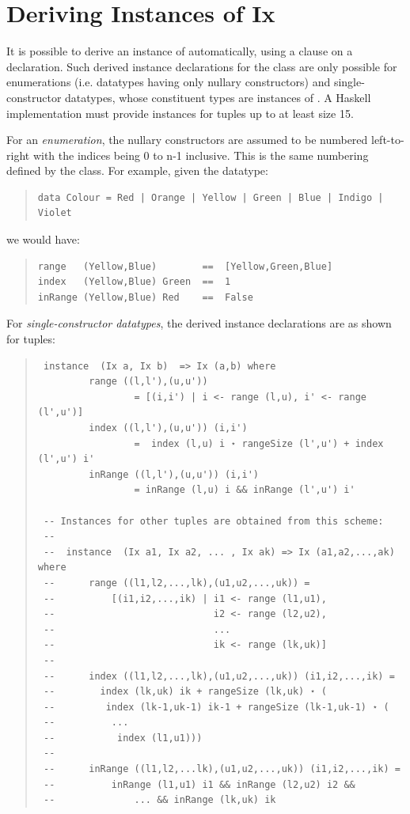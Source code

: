 \section{Deriving Instances of Ix}
It is possible to derive an instance of  automatically, using a
  clause on a  declaration. Such derived instance
 declarations for the class  are only possible for enumerations (i.e.
 datatypes having only nullary constructors) and single-constructor
 datatypes, whose constituent types are instances of . A Haskell
 implementation must provide  instances for tuples up to at least size
 15.\par
For an \emph{enumeration}, the nullary constructors are assumed to be numbered
 left-to-right with the indices being 0 to n-1 inclusive. This is the same
 numbering defined by the  class. For example, given the datatype:\par
\begin{quote}
{\haddockverb\begin{verbatim}
data Colour = Red | Orange | Yellow | Green | Blue | Indigo | Violet
\end{verbatim}}
\end{quote}
we would have:\par
\begin{quote}
{\haddockverb\begin{verbatim}
range   (Yellow,Blue)        ==  [Yellow,Green,Blue]
index   (Yellow,Blue) Green  ==  1
inRange (Yellow,Blue) Red    ==  False
\end{verbatim}}
\end{quote}
For \emph{single-constructor datatypes}, the derived instance declarations are
 as shown for tuples:\par
\begin{quote}
{\haddockverb\begin{verbatim}
 instance  (Ix a, Ix b)  => Ix (a,b) where
         range ((l,l'),(u,u'))
                 = [(i,i') | i <- range (l,u), i' <- range (l',u')]
         index ((l,l'),(u,u')) (i,i')
                 =  index (l,u) i ⋆ rangeSize (l',u') + index (l',u') i'
         inRange ((l,l'),(u,u')) (i,i')
                 = inRange (l,u) i && inRange (l',u') i'

 -- Instances for other tuples are obtained from this scheme:
 --
 --  instance  (Ix a1, Ix a2, ... , Ix ak) => Ix (a1,a2,...,ak)  where
 --      range ((l1,l2,...,lk),(u1,u2,...,uk)) =
 --          [(i1,i2,...,ik) | i1 <- range (l1,u1),
 --                            i2 <- range (l2,u2),
 --                            ...
 --                            ik <- range (lk,uk)]
 --
 --      index ((l1,l2,...,lk),(u1,u2,...,uk)) (i1,i2,...,ik) =
 --        index (lk,uk) ik + rangeSize (lk,uk) ⋆ (
 --         index (lk-1,uk-1) ik-1 + rangeSize (lk-1,uk-1) ⋆ (
 --          ...
 --           index (l1,u1)))
 --
 --      inRange ((l1,l2,...lk),(u1,u2,...,uk)) (i1,i2,...,ik) =
 --          inRange (l1,u1) i1 && inRange (l2,u2) i2 &&
 --              ... && inRange (lk,uk) ik
\end{verbatim}}
\end{quote}